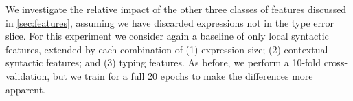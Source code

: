 We investigate the relative impact of the other
three classes of features discussed in \autoref{sec:features}, assuming
we have discarded expressions not in the type error slice.
%
For this experiment we consider again a baseline of only local syntactic
features, extended by each combination of
%
(1) expression size;
(2) contextual syntactic features; and
(3) typing features.
%
As before, we perform a 10-fold cross-validation,
but we train for a full 20 epochs to make the differences more apparent.
%
